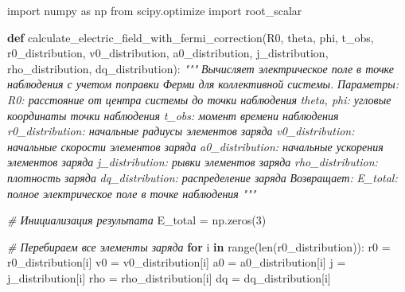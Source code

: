 \documentclass[11pt]{article}
\newenvironment{Shaded}{}{}
\newcommand{\KeywordTok}[1]{\textcolor[rgb]{0.00,0.44,0.13}{\textbf{{#1}}}}
\newcommand{\DecValTok}[1]{\textcolor[rgb]{0.25,0.63,0.44}{{#1}}}
\newcommand{\CommentTok}[1]{\textcolor[rgb]{0.38,0.63,0.69}{\textit{{#1}}}}
\newcommand{\NormalTok}[1]{{#1}}
\newcommand{\ImportTok}[1]{{#1}}
\newcommand{\ControlFlowTok}[1]{\textcolor[rgb]{0.00,0.44,0.13}{\textbf{{#1}}}}
\newcommand{\OperatorTok}[1]{\textcolor[rgb]{0.40,0.40,0.40}{{#1}}}
\newcommand{\BuiltInTok}[1]{{#1}}
\begin{document}
\begin{Shaded}
\begin{Highlighting}[]
\ImportTok{import}\NormalTok{ numpy }\ImportTok{as}\NormalTok{ np}
\ImportTok{from}\NormalTok{ scipy.optimize }\ImportTok{import}\NormalTok{ root_scalar}

\KeywordTok{def}\NormalTok{ calculate_electric_field_with_fermi_correction(R0, theta, phi, t_obs, }
\NormalTok{                                                  r0_distribution, v0_distribution, a0_distribution, j_distribution,}
\NormalTok{                                                  rho_distribution, dq_distribution):}
    \CommentTok{"""}
\CommentTok{    Вычисляет электрическое поле в точке наблюдения с учетом поправки Ферми для коллективной системы.}
\CommentTok{    }
\CommentTok{    Параметры:}
\CommentTok{    R0: расстояние от центра системы до точки наблюдения}
\CommentTok{    theta, phi: угловые координаты точки наблюдения}
\CommentTok{    t_obs: момент времени наблюдения}
\CommentTok{    r0_distribution: начальные радиусы элементов заряда}
\CommentTok{    v0_distribution: начальные скорости элементов заряда}
\CommentTok{    a0_distribution: начальные ускорения элементов заряда}
\CommentTok{    j_distribution: рывки элементов заряда}
\CommentTok{    rho_distribution: плотность заряда}
\CommentTok{    dq_distribution: распределение заряда}
\CommentTok{    }
\CommentTok{    Возвращает:}
\CommentTok{    E_total: полное электрическое поле в точке наблюдения}
\CommentTok{    """}

    \CommentTok{# Инициализация результата}
\NormalTok{    E_total }\OperatorTok{=}\NormalTok{ np.zeros(}\DecValTok{3}\NormalTok{)}

    \CommentTok{# Перебираем все элементы заряда}
    \ControlFlowTok{for}\NormalTok{ i }\KeywordTok{in} \BuiltInTok{range}\NormalTok{(}\BuiltInTok{len}\NormalTok{(r0_distribution)):}
\NormalTok{        r0 }\OperatorTok{=}\NormalTok{ r0_distribution[i]}
\NormalTok{        v0 }\OperatorTok{=}\NormalTok{ v0_distribution[i]}
\NormalTok{        a0 }\OperatorTok{=}\NormalTok{ a0_distribution[i]}
\NormalTok{        j }\OperatorTok{=}\NormalTok{ j_distribution[i]}
\NormalTok{        rho }\OperatorTok{=}\NormalTok{ rho_distribution[i]}
\NormalTok{        dq }\OperatorTok{=}\NormalTok{ dq_distribution[i]}


\end{Highlighting}
\end{Shaded}
\end{document}
